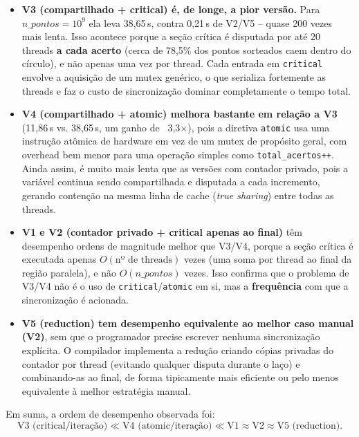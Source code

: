 \documentclass[a4paper,12pt]{article}
\begin{document}
\begin{itemize}
    \item \textbf{V3 (compartilhado + critical) é, de longe, a pior
    versão.} Para $n\_pontos=10^9$ ela leva 38,65\,s, contra 0,21\,s
    de V2/V5 -- quase 200 vezes mais lenta. Isso acontece porque a
    seção crítica é disputada por até 20 threads \textbf{a cada
    acerto} (cerca de 78,5\% dos pontos sorteados caem dentro do
    círculo), e não apenas uma vez por thread. Cada entrada em
    \texttt{critical} envolve a aquisição de um mutex genérico, o
    que serializa fortemente as threads e faz o custo de
    sincronização dominar completamente o tempo total.

    \item \textbf{V4 (compartilhado + atomic) melhora bastante em
    relação a V3} (11,86\,s vs. 38,65\,s, um ganho de ~3,3$\times$),
    pois a diretiva \texttt{atomic} usa uma instrução atômica de
    hardware em vez de um
    mutex de propósito geral, com overhead bem menor para uma
    operação simples como \texttt{total\_acertos++}. Ainda assim, é
    muito mais lenta que as versões com contador privado, pois a
    variável continua sendo compartilhada e disputada a cada
    incremento, gerando contenção na mesma linha de cache
    (\emph{true sharing}) entre todas as threads.

    \item \textbf{V1 e V2 (contador privado + critical apenas ao
    final)} têm desempenho ordens de magnitude melhor que V3/V4,
    porque a seção crítica é executada apenas $O(\text{nº de
    threads})$ vezes (uma soma por thread ao final da região
    paralela), e não $O(n\_pontos)$ vezes. Isso confirma que o
    problema de V3/V4 não é o uso de \texttt{critical}/\texttt{atomic}
    em si, mas a \textbf{frequência} com que a sincronização é
    acionada.

    \item \textbf{V5 (reduction) tem desempenho equivalente ao melhor
    caso manual (V2)}, sem que o programador precise escrever
    nenhuma sincronização explícita. O compilador implementa a
    redução criando cópias privadas do contador por thread (evitando
    qualquer disputa durante o laço) e combinando-as ao final, de
    forma tipicamente mais eficiente ou pelo menos equivalente à
    melhor estratégia manual.
\end{itemize}

Em suma, a ordem de desempenho observada foi:
$$\text{V3 (critical/iteração)} \ll \text{V4 (atomic/iteração)} \ll \text{V1} \approx \text{V2} \approx \text{V5 (reduction)}.$$
\end{document}

